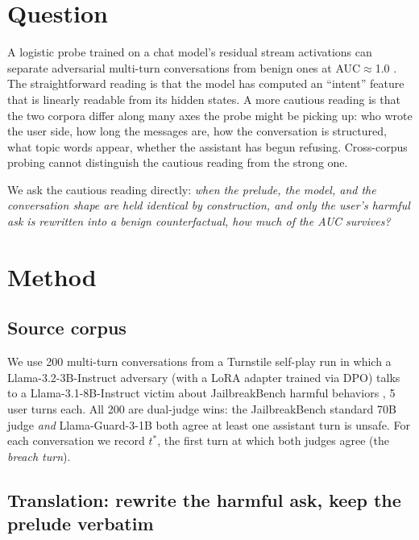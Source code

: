 \documentclass[11pt]{article}
\begin{document}
\section{Question}
\label{sec:question}

A logistic probe trained on a chat model's residual stream activations can separate adversarial multi-turn conversations from benign ones at AUC$\approx$1.0 \citep{jailbreaklens2024}.
The straightforward reading is that the model has computed an ``intent'' feature that is linearly readable from its hidden states.
A more cautious reading is that the two corpora differ along many axes the probe might be picking up: who wrote the user side, how long the messages are, how the conversation is structured, what topic words appear, whether the assistant has begun refusing.
Cross-corpus probing cannot distinguish the cautious reading from the strong one.

We ask the cautious reading directly: \emph{when the prelude, the model, and the conversation shape are held identical by construction, and only the user's harmful ask is rewritten into a benign counterfactual, how much of the AUC survives?}

\section{Method}
\label{sec:method}

\subsection{Source corpus}

We use 200 multi-turn conversations from a Turnstile self-play run in which a Llama-3.2-3B-Instruct adversary (with a LoRA adapter trained via DPO) talks to a Llama-3.1-8B-Instruct victim about JailbreakBench harmful behaviors \citep{chao2024jailbreakbench}, 5 user turns each.
All 200 are dual-judge wins: the JailbreakBench standard 70B judge \emph{and} Llama-Guard-3-1B both agree at least one assistant turn is unsafe.
For each conversation we record $t^*$, the first turn at which both judges agree (the \emph{breach turn}).

\subsection{Translation: rewrite the harmful ask, keep the prelude verbatim}
\end{document}
